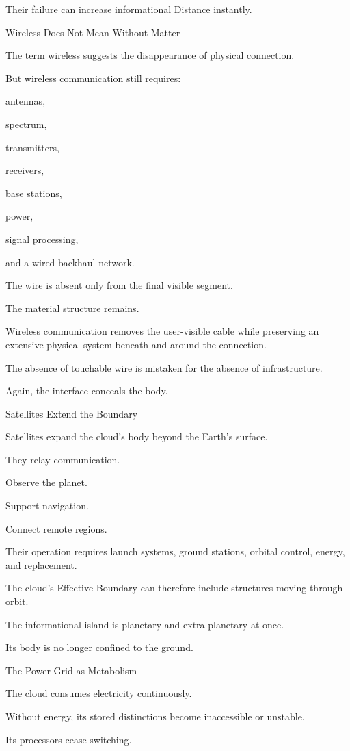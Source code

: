 Their failure can increase informational Distance instantly.

Wireless Does Not Mean Without Matter

The term wireless suggests the disappearance of physical connection.

But wireless communication still requires:

antennas,

spectrum,

transmitters,

receivers,

base stations,

power,

signal processing,

and a wired backhaul network.

The wire is absent only from the final visible segment.

The material structure remains.

Wireless communication removes the user-visible cable while preserving an extensive physical system beneath and around the connection.

The absence of touchable wire is mistaken for the absence of infrastructure.

Again, the interface conceals the body.

Satellites Extend the Boundary

Satellites expand the cloud’s body beyond the Earth’s surface.

They relay communication.

Observe the planet.

Support navigation.

Connect remote regions.

Their operation requires launch systems, ground stations, orbital control, energy, and replacement.

The cloud’s Effective Boundary can therefore include structures moving through orbit.

The informational island is planetary and extra-planetary at once.

Its body is no longer confined to the ground.

The Power Grid as Metabolism

The cloud consumes electricity continuously.

Without energy, its stored distinctions become inaccessible or unstable.

Its processors cease switching.

